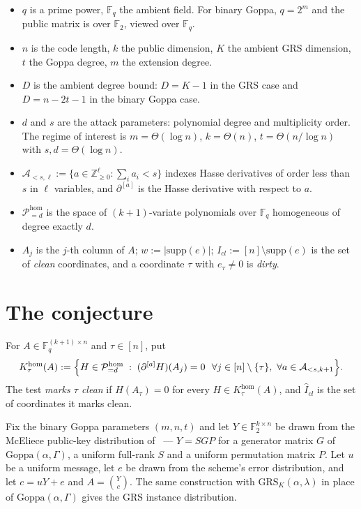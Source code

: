 \documentclass{aicr-conjecture}
\newcommand{\F}{\mathbb{F}}
\newcommand{\Z}{\mathbb{Z}}
\newcommand{\supp}{\mathrm{supp}}
\newcommand{\Phom}{\mathcal{P}}
\newcommand{\Aset}{\mathcal{A}}
\newcommand{\GRS}{\mathrm{GRS}}
\newcommand{\Goppa}{\mathrm{Goppa}}
\newcommand{\hm}{\mathrm{hom}}
\begin{document}
\begin{itemize}[nosep]
  \item $q$ is a prime power, $\F_{q}$ the ambient field. For binary
    Goppa, $q = 2^{m}$ and the public matrix is over $\F_{2}$, viewed
    over $\F_{q}$.
  \item $n$ is the code length, $k$ the public dimension, $K$ the ambient
    GRS dimension, $t$ the Goppa degree, $m$ the extension degree.
  \item $D$ is the ambient degree bound: $D = K - 1$ in the GRS case and
    $D = n - 2t - 1$ in the binary Goppa case.
  \item $d$ and $s$ are the attack parameters: polynomial degree and
    multiplicity order. The regime of interest is $m = \Theta(\log n)$,
    $k = \Theta(n)$, $t = \Theta(n/\log n)$ with $s, d = \Theta(\log n)$.
  \item $\Aset_{<s,\ell} := \{a \in \Z_{\ge 0}^{\ell} : \sum_{i} a_{i} <
    s\}$ indexes Hasse derivatives of order less than $s$ in $\ell$
    variables, and $\partial^{[a]}$ is the Hasse derivative with respect
    to $a$.
  \item $\Phom^{\hm}_{=d}$ is the space of $(k+1)$-variate
    polynomials over $\F_{q}$ homogeneous of degree exactly $d$.
  \item $A_{j}$ is the $j$-th column of $A$; $w := |\supp(e)|$; $I_{cl}
    := [n] \setminus \supp(e)$ is the set of \emph{clean} coordinates,
    and a coordinate $\tau$ with $e_{\tau} \ne 0$ is \emph{dirty}.
\end{itemize}

\section{The conjecture}\label{sec:conjectures}

\begin{definition}\label{def:kernel}
For $A \in \F_{q}^{(k+1) \times n}$ and $\tau \in [n]$, put
\[
  K^{\hm}_{\tau}(A) := \Bigl\{ H \in
  \Phom^{\hm}_{=d} \;:\; (\partial^{[a]} H)(A_{j}) = 0
  \ \ \forall j \in [n] \setminus \{\tau\},\ \forall a \in
  \Aset_{<s,k+1} \Bigr\}.
\]
The test \emph{marks $\tau$ clean} if $H(A_{\tau}) = 0$ for every $H \in
K^{\hm}_{\tau}(A)$, and $\widehat{I}_{cl}$ is the set of
coordinates it marks clean.
\end{definition}

\begin{definition}\label{def:instance}
Fix the binary Goppa parameters $(m, n, t)$ and let $Y \in
\F_{2}^{k \times n}$ be drawn from the McEliece public-key distribution
of~{\cite[Definition 2.4]{GIJS26}} --- $Y = SGP$ for a generator matrix
$G$ of $\Goppa(\alpha, \Gamma)$, a uniform full-rank $S$ and a uniform
permutation matrix $P$. Let $u$ be a uniform message, let $e$ be drawn
from the scheme's error distribution, and let $c = uY + e$ and $A =
\binom{Y}{c}$. The same construction with $\GRS_{K}(\alpha,\lambda)$ in
place of $\Goppa(\alpha,\Gamma)$ gives the GRS instance distribution.
\end{definition}
\end{document}
